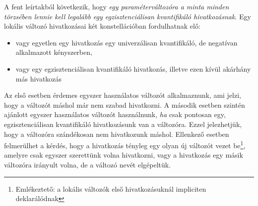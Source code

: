 A fent leírtakból következik, hogy \emph{egy paraméterváltozóra a minta minden törzsében lennie kell legalább egy egzisztenciálisan kvantifikáló hivatkozásnak}.
Egy lokális változó hivatkozásai két konstellációban fordulhatnak elő:
\begin{itemize}
    \item vagy egyetlen egy hivatkozás egy univerzálisan kvantifikáló, de negatívan alkalmazott kényszerben,
    \item vagy egy egzisztenciálisan kvantifikáló hivatkozás, illetve ezen kívül akárhány más hivatkozás
\end{itemize}
Az első esetben érdemes egyszer használatos változót alkalmaznunk, ami jelzi, hogy a változót máshol már nem szabad hivatkozni.
A második esetben szintén ajánlott egyszer használatos változót használnunk, \emph{ha} csak pontosan egy, egzisztenciálisan kvantifikáló hivatkozásunk van a változóra.
Ezzel jelezhetjük, hogy a változóra szándékosan nem hivatkozunk máshol.
Ellenkező esetben felmerülhet a kérdés, hogy a hivatkozás tényleg egy olyan új változót vezet be\footnote{Emlékeztető: a lokális változók első hivatkozásuknál impliciten deklarálódnak}, amelyre csak egyszer szerettünk volna hivatkozni, vagy a hivatkozás egy másik változóra irányult volna, de a változó nevét elgépeltük.

